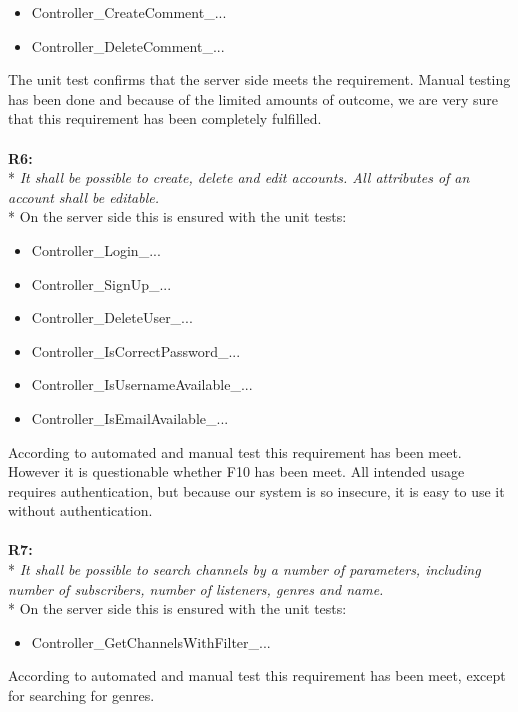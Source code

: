 \documentclass[a4paper,11pt,report]{article}
\begin{document}
{\begin{itemize}
\item Controller\_CreateComment\_...
\item Controller\_DeleteComment\_...
\end{itemize}
The unit test confirms that the server side meets the requirement. Manual testing has been done and because of the limited amounts of outcome, we are very sure that this requirement has been completely fulfilled. \\ \\
\textbf{R6:} \\*
\textit{It shall be possible to create, delete and edit accounts. All attributes of an account shall be editable.} \\*
On the server side this is ensured with the unit tests:
\begin{itemize}
\item Controller\_Login\_...
\item Controller\_SignUp\_...
\item Controller\_DeleteUser\_...
\item Controller\_IsCorrectPassword\_...
\item Controller\_IsUsernameAvailable\_...
\item Controller\_IsEmailAvailable\_...
\end{itemize}
According to automated and manual test this requirement has been meet. However it is questionable whether F10 has been meet. All intended usage requires authentication, but because our system is so insecure, it is easy to use it without authentication. \\ \\
\textbf{R7:} \\*
\textit{It shall be possible to search channels by a number of parameters, including number of subscribers, number of listeners, genres and name.} \\*
On the server side this is ensured with the unit tests:
\begin{itemize}
\item Controller\_GetChannelsWithFilter\_...
\end{itemize}
According to automated and manual test this requirement has been meet, except for searching for genres.

}
\end{document}
